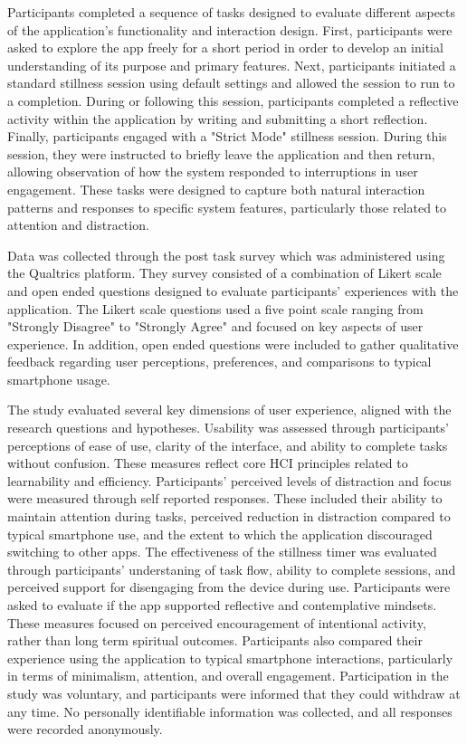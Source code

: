 \documentclass[12pt]{article}
\begin{document}
Participants completed a sequence of tasks designed to evaluate different aspects of the application's functionality and interaction design. First, participants were asked to explore the app freely for a short period in order to develop an initial understanding of its purpose and primary features. Next, participants initiated a standard stillness session using default settings and allowed the session to run to a completion. During or following this session, participants completed a reflective activity within the application by writing and submitting a short reflection. Finally, participants engaged with a "Strict Mode" stillness session. During this session, they were instructed to briefly leave the application and then return, allowing observation of how the system responded to interruptions in user engagement. These tasks were designed to capture both natural interaction patterns and responses to specific system features, particularly those related to attention and distraction. 

Data was collected through the post task survey which was administered using the Qualtrics platform. They survey consisted of a combination of Likert scale and open ended questions designed to evaluate participants' experiences with the application. The Likert scale questions used a five point scale ranging from "Strongly Disagree" to "Strongly Agree" and focused on key aspects of user experience. In addition, open ended questions were included to gather qualitative feedback regarding user perceptions, preferences, and comparisons to typical smartphone usage.

The study evaluated several key dimensions of user experience, aligned with the research questions and hypotheses. Usability was assessed through participants' perceptions of ease of use, clarity of the interface, and ability to complete tasks without confusion. These measures reflect core HCI principles related to learnability and efficiency. Participants' perceived levels of distraction and focus were measured through self reported responses. These included their ability to maintain attention during tasks, perceived reduction in distraction compared to typical smartphone use, and the extent to which the application discouraged switching to other apps. The effectiveness of the stillness timer was evaluated through participants' understaning of task flow, ability to complete sessions, and perceived support for disengaging from the device during use. Participants were asked to evaluate if the app supported reflective and contemplative mindsets. These measures focused on perceived encouragement of intentional activity, rather than long term spiritual outcomes. Participants also compared their experience using the application to typical smartphone interactions, particularly in terms of minimalism, attention, and overall engagement. Participation in the study was voluntary, and participants were informed that they could withdraw at any time. No personally identifiable information was collected, and all responses were recorded anonymously. 
\end{document}
